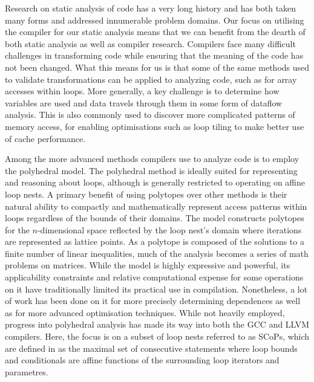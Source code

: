 Research on static analysis of code has a very long history and has both taken many forms and addressed innumerable problem domains\cite{Andrade:2012:SAW:2355585.2355593}\cite{1194988}.
Our focus on utilising the compiler for our static analysis means that we can benefit from the dearth of both static analysis as well as compiler research.
Compilers face many difficult challenges in transforming code while ensuring that the meaning of the code has not been changed.
What this means for us is that some of the same methods used to validate transformations can be applied to analyzing code, such as for array accesses within loops.
More generally, a key challenge is to determine how variables are used and data travels through them in some form of dataflow analysis\cite{Feautrier1991}.
This is also commonly used to discover more complicated patterns of memory access, for enabling optimisations such as loop tiling to make better use of cache performance.

Among the more advanced methods compilers use to analyze
code is to employ the polyhedral model\cite{Cousot:1978:ADL:512760.512770}\cite{Bagnara:2009:APC:1628316.1628385}\cite{benabderrahmane.10.cc}.
The polyhedral method is ideally suited for representing and reasoning about loops, although is generally restricted to operating on affine loop nests.
A primary benefit of using polytopes over other methods is their natural ability to compactly and mathematically represent access patterns within loops regardless of the bounds of their domains.
The model constructs polytopes for the $n$-dimensional space reflected by the loop nest's domain where iterations are represented as lattice points.
As a polytope is composed of the solutions to a finite number of linear inequalities, much of the analysis becomes a series of math problems on matrices.
While the model is highly expressive and powerful, its applicability constraints and relative computational expense for some operations on it have traditionally limited its practical use in compilation\cite{DBLP:journals/entcs/Simon10a}.
Nonetheless, a lot of work has been done on it for more precisely determining dependences\cite{Vasilache:2006:VDA:1183401.1183448} as well as for more advanced optimisation techniques\cite{Nieuwenhuizen2014AutovectorizationUP}\cite{5260526}.
While not heavily employed, progress into polyhedral analysis has made its way into both the \ac{GCC}\cite{trifunovic:inria-00551516} and LLVM\cite{grosser.11.impact} compilers.
Here, the focus is on a subset of loop nests referred to as \acp{SCoP}\cite{TBas}, which are defined in \cite{benabderrahmane.10.cc} as the maximal set of consecutive statements where loop bounds and conditionals are affine functions of the surrounding loop iterators and parametres.

